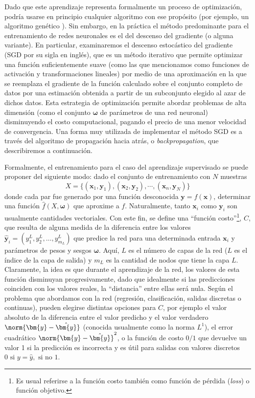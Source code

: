 Dado que este aprendizaje representa formalmente un proceso de optimización, podría usarse en principio cualquier algoritmo con ese propósito (por ejemplo, un algoritmo genético \cite{gupta1999, mirjalili2019, lanham2023}). Sin embargo, en la práctica el método predominante para el entrenamiento de redes neuronales es el del descenso del gradiente (o alguna variante). En particular, examinaremos el descenso estocástico del gradiente (SGD por su sigla en inglés), que es un método iterativo que permite optimizar una función suficientemente suave (como las que mencionamos como funciones de activación y transformaciones lineales) por medio de una aproximación en la que se reemplaza el gradiente de la función calculado sobre el conjunto completo de datos por una estimación obtenida a partir de un subconjunto elegido al azar de dichos datos. Esta estrategia de optimización permite abordar problemas de alta dimensión (como el conjunto $\bm{\omega}$ de parámetros de una red neuronal) disminuyendo el costo computacional, pagando el precio de una menor velocidad de convergencia. Una forma muy utilizada de implementar el método SGD es a través del algoritmo de propagación hacia atrás, o \textit{backpropagation}, que describiremos a continuación.

Formalmente, el entrenamiento para el caso del aprendizaje supervisado se puede proponer del siguiente modo: dado el conjunto de entrenamiento con $N$ muestras
\[ X = \{ (\bm{x}_1,\bm{y}_1), (\bm{x}_2, \bm{y}_2), \cdots, (\bm{x}_n, \bm{y}_N) \} \]
donde cada par fue generado por una función desconocida $\bm{y} = f(\bm{x})$, determinar una función $\hat{f}(X, \bm{\omega})$ que aproxime a $f$. Naturalmente, tanto $\bm{x}_i$ como $\bm{y}_i$ son usualmente cantidades vectoriales. Con este fin, se define una ``función costo''\footnote{Es usual referirse a la función costo también como función de pérdida (\textit{loss}) o función objetivo.}, $C$, que resulta de alguna medida de la diferencia entre los valores $\hat{\bm{y}}_i = (y_1^L, y_2^L, \ldots, y_{m_L}^L)$ que predice la red para una determinada entrada $\bm{x}_i$ y parámetros de pesos y sesgos $\bm{\omega}$. Aquí, $L$ es el número de capas de la red ($L$ es el índice de la capa de salida) y $m_L$ es la cantidad de nodos que tiene la capa $L$. Claramente, la idea es que durante el aprendizaje de la red, los valores de esta función disminuyan progresivamente, dado que idealmente si las predicciones coinciden con los valores reales, la ``distancia'' entre ellas será nula. Según el problema que abordamos con la red (regresión, clasificación, salidas discretas o continuas), pueden elegirse distintas opciones para $C$, por ejemplo el valor absoluto de la diferencia entre el valor predicho y el valor verdadero $\norm{\bm{y} - \hat{\bm{y}}}$ (conocida usualmente como la norma $L^1$), el error cuadrático $\norm{\bm{y} - \hat{\bm{y}}}^2$, o la función de costo $0/1$ que devuelve un valor 1 si la predicción es incorrecta y es útil para salidas con valores discretos $0 \text{ si } y = \hat{y}, \text{ si no } 1$. 

